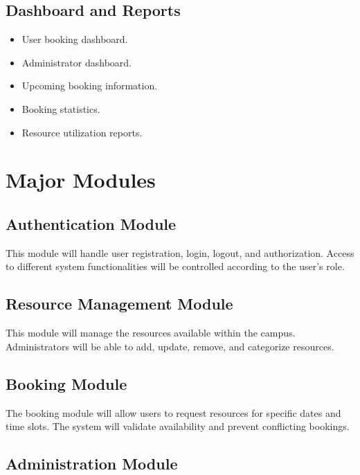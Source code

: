 \documentclass[12pt,a4paper]{article}
\begin{document}
\subsection{Dashboard and Reports}

\begin{itemize}
    \item User booking dashboard.
    \item Administrator dashboard.
    \item Upcoming booking information.
    \item Booking statistics.
    \item Resource utilization reports.
\end{itemize}



\section{Major Modules}

\subsection{Authentication Module}

This module will handle user registration, login, logout, and authorization. Access to different system functionalities will be controlled according to the user's role.

\subsection{Resource Management Module}

This module will manage the resources available within the campus. Administrators will be able to add, update, remove, and categorize resources.

\subsection{Booking Module}

The booking module will allow users to request resources for specific dates and time slots. The system will validate availability and prevent conflicting bookings.

\subsection{Administration Module}
\end{document}
